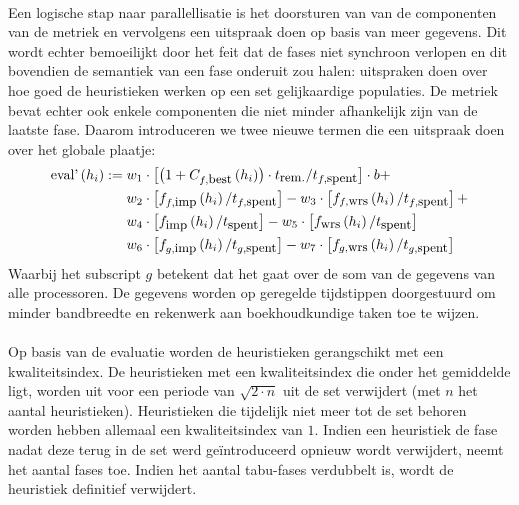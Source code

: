 \paragraph{}
Een logische stap naar parallellisatie is het doorsturen van van de componenten van de metriek en vervolgens een uitspraak doen op basis van meer gegevens. Dit wordt echter bemoeilijkt door het feit dat de fases niet synchroon verlopen en dit bovendien de semantiek van een fase onderuit zou halen: uitspraken doen over hoe goed de heuristieken werken op een set gelijkaardige populaties. De metriek bevat echter ook enkele componenten die niet minder afhankelijk zijn van de laatste fase. Daarom introduceren we twee nieuwe termen die een uitspraak doen over het globale plaatje:
\begin{align*}
\mbox{eval'}\left(h_i\right):={}&w_1\cdot\left[\left(1+C_{f,\mbox{\small{best}}}\left(h_i\right)\right)\cdot t_{\mbox{\small{rem.}}}/t_{f,\mbox{\small{spent}}}\right]\cdot b+\\
&w_2\cdot\left[f_{f,\mbox{\small{imp}}}\left(h_i\right)/t_{f,\mbox{\small{spent}}}\right]-w_3\cdot\left[f_{f,\mbox{\small{wrs}}}\left(h_i\right)/t_{f,\mbox{\small{spent}}}\right]+\\
&w_4\cdot\left[f_{\mbox{\small{imp}}}\left(h_i\right)/t_{\mbox{\small{spent}}}\right]-w_5\cdot\left[f_{\mbox{\small{wrs}}}\left(h_i\right)/t_{\mbox{\small{spent}}}\right]\\
&w_6\cdot\left[f_{g,\mbox{\small{imp}}}\left(h_i\right)/t_{g,\mbox{\small{spent}}}\right]-w_7\cdot\left[f_{g,\mbox{\small{wrs}}}\left(h_i\right)/t_{g,\mbox{\small{spent}}}\right]
\end{align*}
Waarbij het subscript $g$ betekent dat het gaat over de som van de gegevens van alle processoren. De gegevens worden op geregelde tijdstippen doorgestuurd om minder bandbreedte en rekenwerk aan boekhoudkundige taken toe te wijzen.

\paragraph{}
Op basis van de evaluatie worden de heuristieken gerangschikt met een kwaliteitsindex. De heuristieken met een kwaliteitsindex die onder het gemiddelde ligt, worden uit voor een periode van $\sqrt{2\cdot n}$ uit de set verwijdert (met $n$ het aantal heuristieken). Heuristieken die tijdelijk niet meer tot de set behoren worden hebben allemaal een kwaliteitsindex van $1$. Indien een heuristiek de fase nadat deze terug in de set werd ge\"introduceerd opnieuw wordt verwijdert, neemt het aantal fases toe. Indien het aantal tabu-fases verdubbelt is, wordt de heuristiek definitief verwijdert.

\paragraph{}


